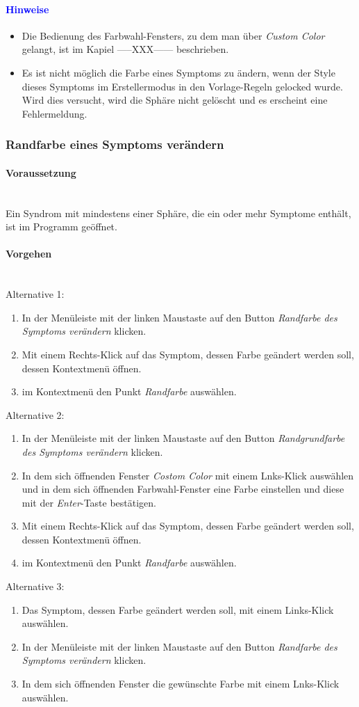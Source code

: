 \documentclass[enabledeprecatedfontcommands,fontsize=11pt,paper=a4,twoside]{scrartcl}
\newcommand*{\hint}{\paragraph{\textcolor{blue}{Hinweise}}}
\newcommand*{\condition}{\paragraph{Voraussetzung}$\;$ \vspace{0.2cm}\\}
\newcommand*{\actions}{\paragraph{Vorgehen} $\;$\vspace{0.2cm}\\}
\begin{document}
		\hint
		\begin{itemize}
			\item Die Bedienung des Farbwahl-Fensters, zu dem man über \textit{Custom Color} gelangt, ist im Kapiel -----XXX------ beschrieben.
			\item Es ist nicht möglich die Farbe eines Symptoms zu ändern, wenn der Style dieses Symptoms im Erstellermodus in den Vorlage-Regeln gelocked wurde. Wird dies versucht, wird die Sphäre nicht gelöscht und es erscheint eine Fehlermeldung.
	\end{itemize}	
		\subsubsection{Randfarbe eines Symptoms verändern}
				\condition 	
		Ein Syndrom mit mindestens einer Sphäre, die ein oder mehr Symptome enthält, ist im Programm geöffnet. 
		\actions
		Alternative 1:
		\begin{enumerate}
			\item In der Menüleiste mit der linken Maustaste auf den Button \textit{Randfarbe des Symptoms verändern} klicken.
			\item Mit einem Rechts-Klick auf das Symptom, dessen Farbe geändert werden soll, dessen Kontextmenü öffnen.
			\item im Kontextmenü den Punkt \textit{Randfarbe} auswählen.
		\end{enumerate}
		Alternative 2:
		\begin{enumerate}
			\item In der Menüleiste mit der linken Maustaste auf den Button \textit{Randgrundfarbe des Symptoms verändern} klicken.
			\item In dem sich öffnenden Fenster \textit{Costom Color} mit einem Lnks-Klick auswählen und in dem sich öffnenden Farbwahl-Fenster eine Farbe einstellen und diese mit der \textit{Enter}-Taste bestätigen.
			 \item Mit einem Rechts-Klick auf das Symptom, dessen Farbe geändert werden soll, dessen Kontextmenü öffnen.
			\item im Kontextmenü den Punkt \textit{Randfarbe} auswählen.
		\end{enumerate}
		Alternative 3:
		\begin{enumerate}
			\item Das Symptom, dessen Farbe geändert werden soll, mit einem Links-Klick auswählen.
			\item In der Menüleiste mit der linken Maustaste auf den Button \textit{Randfarbe des Symptoms verändern} klicken.
			\item In dem sich öffnenden Fenster die gewünschte Farbe mit einem Lnks-Klick auswählen.
		\end{enumerate}
\end{document}
